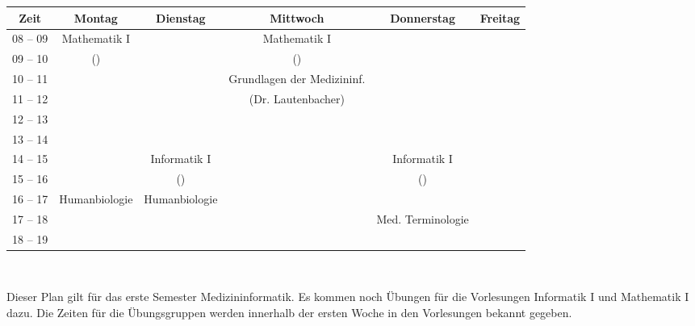 \begin{minipage}{\textwidth}
    \footnotesize
\begin{center}
\begin{tabular}{|c|c|c|c|c|c|}
	\hline
	Zeit    & Montag       	& Dienstag    	& Mittwoch                  	& Donnerstag		& Freitag   \\\hline\hline
	08 – 09 & Mathematik I 	&             	& Mathematik I              	&			&			\\\cline{1-1}\cline{3-3}\cline{5-6}
	09 – 10 & (\Matheprof) 	&             	& (\Matheprof)              	&   			&			\\\hline
	10 – 11 &              	&             	& Grundlagen der Medizininf.	&			&			\\\cline{1-3}\cline{5-6}
	11 – 12 &              	&             	& (Dr. Lautenbacher)        	&			&			\\\hline
	12 – 13 &              	&             	&                           	&			&			\\\hline
	13 – 14 &              	&             	&                           	&			&			\\\hline
	14 – 15 &              	& Informatik I	&                           	& Informatik I		&			\\\cline{1-2}\cline{4-4}\cline{6-6}
	15 – 16 &              	& (\Infoprof) 	&                           	& (\Infoprof)		&			\\\hline
	16 – 17 & Humanbiologie	& Humanbiologie &                           	&			&			\\\cline{1-1}\cline{4-6}
	17 – 18 &              	&             	&                           	& Med. Terminologie	&			\\\cline{1-4}\cline{6-6}
 	18 – 19 &              	&             	&                           	& 			&			\\\hline
\end{tabular}
    ~\\
\end{center}
\end{minipage}
Dieser Plan gilt für das erste Semester Medizininformatik. Es kommen noch Übungen für die Vorlesungen
Informatik I und Mathematik I dazu. Die Zeiten für die Übungsgruppen werden innerhalb der ersten Woche in den Vorlesungen bekannt gegeben. \\ \\
